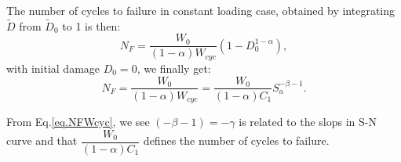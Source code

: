 The number of cycles to failure in constant loading case, obtained by integrating $\tilde{D}$ from $\tilde{D}_0$ to 1 is then:
$$N_F=\dfrac{W_0}{\left( 1-\alpha\right)W_{cyc} }\left( 1-D_0^{1-\alpha}\right) ,$$
with initial damage $D_0=0$, we finally get:
\begin{equation}
N_F=\dfrac{W_0}{\left( 1-\alpha\right)W_{cyc} }=\dfrac{W_0}{(1-\alpha)C_1}S_{a}^{-\beta-1}.
\label{eq.NFWcyc}
\end{equation}

From Eq.\eqref{eq.NFWcyc}, we see $(-\beta-1)=-\gamma$ is related to the slops in S-N curve and that $\dfrac{W_0}{(1-\alpha)C_1}$ defines the number of cycles to failure.

% 
%
%
%

